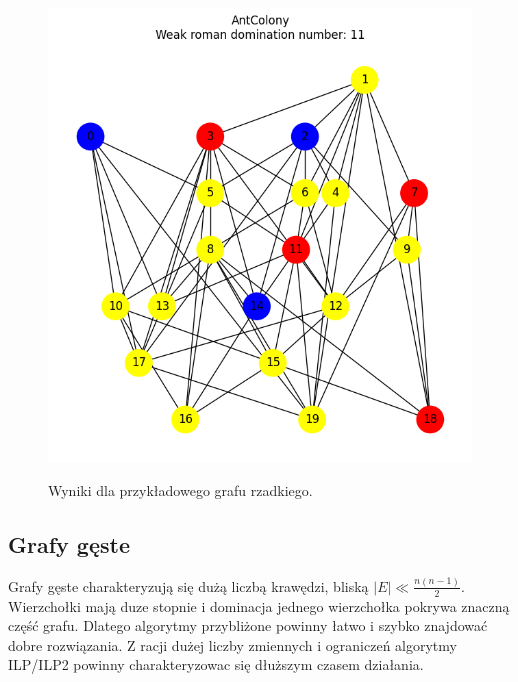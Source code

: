 \begin{figure}[htbp]
\begin{subcaptionbox}
            {\includegraphics[width=0.75\linewidth]{assets/plots/AntColony/ErdosRenyi_sparse_n20_i2_results.png}}
        \end{subcaptionbox}
    
        \caption{Wyniki dla przykładowego grafu rzadkiego.}
        \label{fig:sparse}
    \end{figure}

\subsection{Grafy gęste}

Grafy gęste charakteryzują się dużą liczbą krawędzi, bliską $|E| \ll \frac{n(n - 1)}{2}$. Wierzchołki mają duze stopnie i dominacja jednego wierzchołka pokrywa znaczną część grafu. Dlatego algorytmy przybliżone powinny łatwo i szybko znajdować dobre rozwiązania. Z racji dużej liczby zmiennych i ograniczeń algorytmy ILP/ILP2 powinny charakteryzowac się dłuższym czasem działania.

